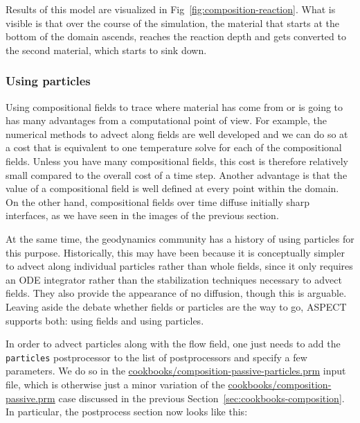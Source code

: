 \documentclass{article}
\newcommand{\aspect}{\textsc{ASPECT}}
\begin{document}
Results of this model are visualized in
Fig~\ref{fig:composition-reaction}. What is visible is
that over the course of the simulation, the material that starts at the bottom
of the domain ascends, reaches the reaction depth and gets converted to the second material, which starts to sink down.



\subsubsection{Using particles}
\label{sec:cookbooks-particles}

Using compositional fields to trace where material has come from or is going to
has many advantages from a computational point of view. For example, the
numerical methods to advect along fields are well developed and we can do so at
a cost that is equivalent to one temperature solve for each of the compositional
fields. Unless you have many compositional fields, this cost is therefore
relatively small compared to the overall cost of a time step. Another advantage
is that the value of a compositional field is well defined at every point within
the domain. On the other hand, compositional fields over time diffuse initially
sharp interfaces, as we have seen in the images of the previous section.

At the same time, the geodynamics community has a history of using particles for
this purpose. Historically, this may have been because it is conceptually
simpler to advect along individual particles rather than whole fields, since it
only requires an ODE integrator rather than the stabilization techniques
necessary to advect fields. They also provide the appearance of no diffusion,
though this is arguable. Leaving aside the debate whether fields or particles are the
way to go, \aspect{} supports both: using fields and using particles.

In order to advect particles along with the flow field, one just needs to
add the \texttt{particles} postprocessor to the list of postprocessors and specify
a few parameters. We do so in the
\url{cookbooks/composition-passive-particles.prm} input file, which is otherwise
just a minor variation of the \url{cookbooks/composition-passive.prm} case
discussed in the previous Section~\ref{sec:cookbooks-composition}. In
particular, the postprocess section now looks like this:

\end{document}
